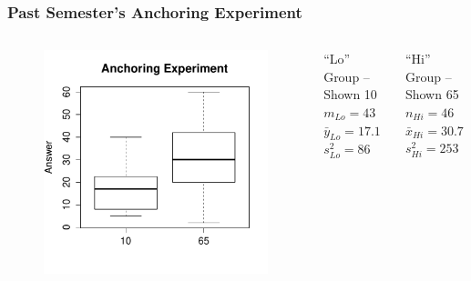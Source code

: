 \begin{frame}[t]
\frametitle{Past Semester's Anchoring Experiment}

\begin{columns}
	\begin{figure}
	\centering
	\includegraphics[scale = 0.4]{./images/anchoring_boxplot}
	\end{figure}

	\begin{block}{``Lo'' Group -- Shown 10 }
	$m_{Lo} = 43$\\ $\bar{y}_{Lo} = 17.1$ \\ $s^2_{Lo} = 86$
\end{block}
		\begin{block}{``Hi'' Group -- Shown 65 }
		$n_{Hi} =46$\\ $\bar{x}_{Hi} = 30.7$\\ $s^2_{Hi} = 253$
\end{block}

\end{columns}
\end{frame}
